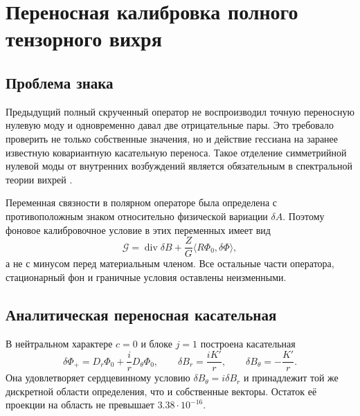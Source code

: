 \chapter{Переносная калибровка полного тензорного вихря}
\label{ch:v6-bosonic-defect-full-tensor-translation-calibration-gate}

\section{Проблема знака}

Предыдущий полный скрученный оператор не воспроизводил точную переносную
нулевую моду и одновременно давал две отрицательные пары. Это требовало
проверить не только собственные значения, но и действие гессиана на заранее
известную ковариантную касательную переноса. Такое отделение симметрийной
нулевой моды от внутренних возбуждений является обязательным в спектральной
теории вихрей \cite{translation-calibration-gustafson,translation-calibration-alonso}.

Переменная связности в полярном операторе была определена с противоположным
знаком относительно физической вариации $\delta A$. Поэтому фоновое
калибровочное условие в этих переменных имеет вид
\begin{equation}
 \mathcal G
 =\operatorname{div}\delta B
 +\frac{Z}{G}\langle R\Phi_0,\delta\Phi\rangle,
\end{equation}
а не с минусом перед материальным членом. Все остальные части оператора,
стационарный фон и граничные условия оставлены неизменными.

\section{Аналитическая переносная касательная}

В нейтральном характере $c=0$ и блоке $j=1$ построена касательная
\begin{equation}
 \delta\Phi_{+}
 =D_r\Phi_0+\frac{i}{r}D_\theta\Phi_0,
 \qquad
 \delta B_r=\frac{iK'}{r},
 \qquad
 \delta B_\theta=-\frac{K'}{r}.
\end{equation}
Она удовлетворяет сердцевинному условию
$\delta B_\theta=i\delta B_r$ и принадлежит той же дискретной области
определения, что и собственные векторы. Остаток её проекции на область не
превышает $3.38\cdot10^{-16}$.

